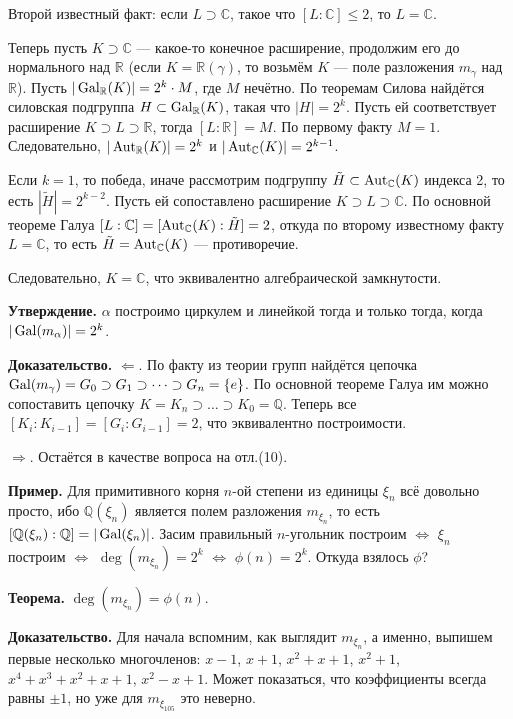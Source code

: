 Второй известный факт: если $L \supset \mathbb C$, такое что $[L : \mathbb C] \le 2$, то $L = \mathbb C$.

Теперь пусть $K \supset \mathbb C$ --- какое-то конечное расширение, продолжим его до нормального над $\mathbb R$ (если $K = \mathbb R(\gamma)$, то возьмём $K$ --- поле разложения $m_\gamma$ над $\mathbb R$).
Пусть $|\operatorname{Gal}_\mathbb R(K)| = 2^k \cdot M$, где $M$ нечётно.
По теоремам Силова найдётся силовская подгруппа $H \subset \operatorname{Gal}_\mathbb R(K)$, такая что $|H| = 2^k$.
Пусть ей соответствует расширение $K \supset L \supset \mathbb R$, тогда $[L : \mathbb R] = M$.
По первому факту $M = 1$.
Следовательно, $|\operatorname{Aut}_\mathbb R(K)| = 2^k$ и $|\operatorname{Aut}_\mathbb C(K)| = 2^{k-1}$.

Если $k = 1$, то победа, иначе рассмотрим подгруппу $\tilde H \subset \operatorname{Aut}_\mathbb C(K)$ индекса 2, то есть $|\tilde H| = 2^{k-2}$.
Пусть ей сопоставлено расширение $K \supset L \supset \mathbb C$.
По основной теореме Галуа $[L : \mathbb C] = [\operatorname{Aut}_\mathbb C(K) : \tilde H] = 2$, откуда по второму известному факту $L = \mathbb C$, то есть $\tilde H = \operatorname{Aut}_\mathbb C(K)$ --- противоречие.

Следовательно, $K = \mathbb C$, что эквивалентно алгебраической замкнутости.

\QED

\textbf{Утверждение.} $\alpha$ построимо циркулем и линейкой тогда и только тогда, когда $|\operatorname{Gal}(m_\alpha)| = 2^k$.

\textbf{Доказательство.} $\Leftarrow$. По факту из теории групп найдётся цепочка $\operatorname{Gal}(m_\gamma) = G_0 \supset G_1 \supset \dots \supset G_n = \{e\}$.
По основной теореме Галуа им можно сопоставить цепочку $K = K_n \supset \dots \supset K_0 = \mathbb Q$.
Теперь все $[K_i : K_{i-1}] = [G_i : G_{i-1}] = 2$, что эквивалентно построимости.

$\Rightarrow$. Остаётся в качестве вопроса на отл.(10).

\QED

\textbf{Пример.} Для примитивного корня $n$-ой степени из единицы $\xi_n$ всё довольно просто, ибо $\mathbb Q(\xi_n)$ является полем разложения $m_{\xi_n}$, то есть $[\mathbb Q(\xi_n) : \mathbb Q] = |\operatorname{Gal}(\xi_n)|$.
Засим правильный $n$-угольник построим $\iff$ $\xi_n$ построим $\iff$ $\deg(m_{\xi_n}) = 2^k$ $\iff$ $\phi(n) = 2^k$.
Откуда взялось $\phi$?

\textbf{Теорема.} $\deg(m_{\xi_n}) = \phi(n)$.

\textbf{Доказательство.} Для начала вспомним, как выглядит $m_{\xi_n}$, а именно, выпишем первые несколько многочленов: $x - 1$, $x + 1$, $x^2 + x + 1$, $x^2 + 1$, $x^4 + x^3 + x^2 + x + 1$, $x^2 - x + 1$.
Может показаться, что коэффициенты всегда равны $\pm 1$, но уже для $m_{\xi_{105}}$ это неверно.

